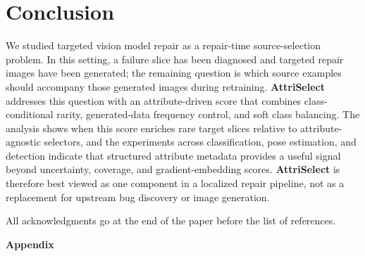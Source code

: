 \documentclass{article}
\newcommand{\modelname}{AttriSelect}
\newcommand{\model}{\textcolor{darkteal}{\textbf{\modelname}}\xspace}
\begin{document}

\section{Conclusion}

We studied targeted vision model repair as a repair-time source-selection problem. In this setting, a failure slice has been diagnosed and targeted repair images have been generated; the remaining question is which source examples should accompany those generated images during retraining. \model addresses this question with an attribute-driven score that combines class-conditional rarity, generated-data frequency control, and soft class balancing. The analysis shows when this score enriches rare target slices relative to attribute-agnostic selectors, and the experiments across classification, pose estimation, and detection indicate that structured attribute metadata provides a useful signal beyond uncertainty, coverage, and gradient-embedding scores. \model is therefore best viewed as one component in a localized repair pipeline, not as a replacement for upstream bug discovery or image generation.

\begin{ack}
All acknowledgments go at the end of the paper before the list of references.
\end{ack}




\newpage
\appendix
\begin{center}
    \LARGE \textbf{Appendix}
    \vspace{1em}
\end{center}
\end{document}
